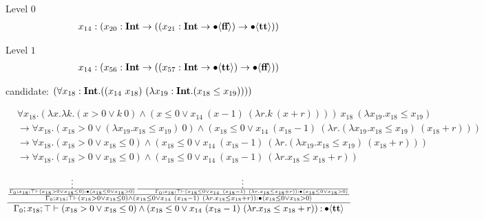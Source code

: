 \documentclass{article}
\begin{document}
Level \( 0 \)
\begin{align*}
x_{ 14 } &: ({ x_{ 20 } } : \textbf{Int} \to (({ x_{ 21 } } : \textbf{Int} \to \bullet \langle  \textbf{ff}  \rangle)\to \bullet \langle  \textbf{tt}  \rangle))\\
\end{align*}

Level \( 1 \)
\begin{align*}
x_{ 14 } &: ({ x_{ 56 } } : \textbf{Int} \to (({ x_{ 57 } } : \textbf{Int} \to \bullet \langle  \textbf{tt}  \rangle)\to \bullet \langle  \textbf{ff}  \rangle))\\
\end{align*}

candidate: \( (\forall x_{ 18 }: \textbf{Int} . ((x_{ 14 }\  x_{ 18 } )\ (\lambda x_{ 19 }: \textbf{Int} . ( x_{ 18 }  \leq  x_{ 19 } )))) \)



\begin{align*}
    &\forall x_{18}. (\lambda x. \lambda k. (x > 0 \vee k\ 0) \wedge (x \leq 0 \vee
    x_{14}\ (x - 1)\  (\lambda r. k\ (x + r))))
    \ x_{18}
    \ (\lambda x_{19}. x_{18} \leq x_{19}) \\
    & \longrightarrow
    \forall x_{18}. (x_{18} > 0 \vee (\lambda x_{19}. x_{18}\leq x_{19})\ 0)
    \wedge (x_{18} \leq 0 \vee
    x_{14}\ (x_{18} - 1)\  (\lambda r. (\lambda x_{19}.x_{18} \leq x_{19}) \
    (x_{18} + r))) \\
    & \longrightarrow
    \forall x_{18}. (x_{18} > 0 \vee x_{18}\leq 0)
    \wedge (x_{18} \leq 0 \vee
    x_{14}\ (x_{18} - 1)\  (\lambda r. (\lambda x_{19}.x_{18} \leq x_{19}) \
    (x_{18} + r))) \\
    & \longrightarrow
    \forall x_{18}. (x_{18} > 0 \vee x_{18}\leq 0)
    \wedge (x_{18} \leq 0 \vee
    x_{14}\ (x_{18} - 1)\  (\lambda r. x_{18} \leq x_{18} + r))
\end{align*}

\begin{align*}
\frac{
\frac{
    \frac{\vdots}{
    \Gamma_0; x_{18}; \top \vdash (x_{18} > 0 \vee x_{18}\leq 0)
    \mathbin{:} \bullet \langle x_{18} \leq 0 \vee x_{18} > 0 \rangle
}
    \frac{\vdots}{
        \qquad \Gamma_0; x_{18}; \top \vdash (x_{18} \leq 0 \vee
    x_{14}\ (x_{18} - 1)\  (\lambda r. x_{18} \leq x_{18} + r)) \mathbin{:}
    \bullet \langle x_{18} \leq 0 \vee x_{18} > 0 \rangle
}
}{
    \Gamma_0; x_{18}; \top \vdash (x_{18} > 0 \vee x_{18}\leq 0)
\wedge (x_{18} \leq 0 \vee
    x_{14}\ (x_{18} - 1)\  (\lambda r. x_{18} \leq x_{18} + r)) \mathbin{:}
    \bullet \langle x_{18} \leq 0 \vee x_{18} > 0 \rangle
}
}{
        \Gamma_0; x_{18}; \top \vdash (x_{18} > 0 \vee x_{18}\leq 0)
\wedge (x_{18} \leq 0 \vee
    x_{14}\ (x_{18} - 1)\  (\lambda r. x_{18} \leq x_{18} + r)) \mathbin{:}
    \bullet \langle \textbf{tt} \rangle
}
\end{align*}
\end{document}
